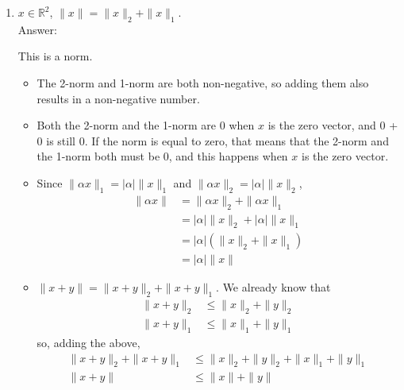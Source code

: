 \documentclass[11pt]{amsart}
\begin{document}
{\begin{enumerate}
{\begin{enumerate}
This is not a norm, because $\|x\|$ is not always non-negative for any given $x\in \mathbb{R}^3$. For example, if $x = \begin{bmatrix} -1 \\ 2\\ -4\end{bmatrix}$, then $\|x\|_2 = \sqrt{21}$ and $\|x\|_1 = 7$, so $\|x\| = \|x\|_2 - \|x\|_1 = \sqrt{21} - 7 \approx -2.417$ which is not positive. In general, the 2-norm is $\leq$ the 1-norm, so this norm can only be 0 or negative. \\

\item $x \in \mathbb{R}^2$, $\|x\| = \|x\|_2 + \|x\|_1$. \\
Answer: 

This is a norm. 
\begin{itemize}
\item The 2-norm and 1-norm are both non-negative, so adding them also results in a non-negative number.
\item Both the 2-norm and the 1-norm are 0 when $x$ is the zero vector, and 0 + 0 is still 0. If the norm is equal to zero, that means that the 2-norm and the 1-norm both must be 0, and this happens when $x$ is the zero vector. 
\item Since $\|\alpha x\|_1 = |\alpha|\|x\|_1$ and $\|\alpha x\|_2 = |\alpha|\|x\|_2$, 
\begin{align} \nonumber
\|\alpha x\| &= \|\alpha x\|_2 + \|\alpha x\|_1 \\ \nonumber
                 &= |\alpha|\|x\|_2 + |\alpha|\|x\|_1 \\ \nonumber
                &= |\alpha|(\|x\|_2 + \|x\|_1) \\ \nonumber
                &= |\alpha|\|x\|
\end{align}
\item $\|x + y\| = \|x + y\|_2 + \|x + y\|_1$. We already know that 
\begin{align} \nonumber
\|x + y\|_2 &\leq \|x\|_2 + \|y\|_2 \\ \nonumber
\|x + y\|_1 &\leq \|x\|_1 + \|y\|_1
\end{align}
so, adding the above,
\begin{align} \nonumber
\|x + y\|_2 + \|x + y\|_1 &\leq \|x\|_2 + \|y\|_2 + \|x\|_1 + \|y\|_1 \\ \nonumber
\|x + y\| &\leq \|x\| + \|y\|
\end{align}
\end{itemize}


\end{enumerate}}
\end{enumerate}}
\end{document}
